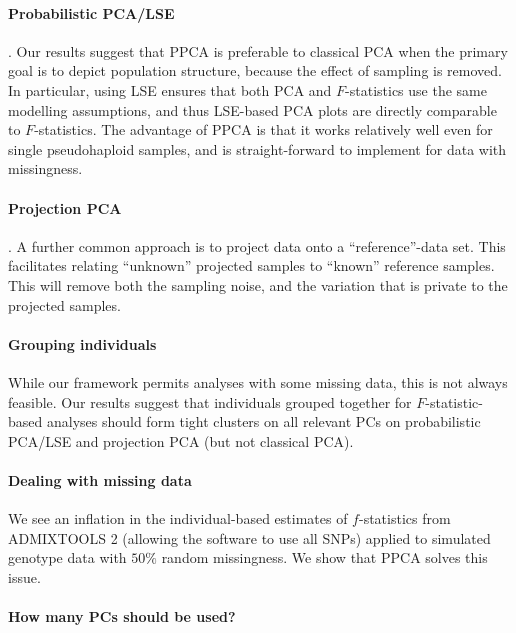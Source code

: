 \documentclass[12pt, letterpaper]{article}
\begin{document}
\paragraph{Probabilistic PCA/LSE}. Our results suggest that PPCA is preferable to classical PCA when the primary goal is to depict population structure, because the effect of sampling is removed. In particular, using LSE ensures that both PCA and $F$-statistics use the same modelling assumptions, and thus LSE-based PCA plots are directly comparable to $F$-statistics. The advantage of PPCA is that it works relatively well even for single pseudohaploid samples, and is straight-forward to implement for data with missingness.

\paragraph{Projection PCA}. A further common approach is to project data onto a ``reference''-data set. This facilitates relating ``unknown'' projected samples to ``known'' reference samples. This will remove both the sampling noise, and the variation that is private to the projected samples. 


\paragraph{Grouping individuals} While our framework permits analyses with some missing data, this is not always feasible. Our results suggest that individuals grouped together for $F$-statistic-based analyses should form tight clusters on all relevant PCs on probabilistic PCA/LSE and projection PCA (but not classical PCA). 


\paragraph{Dealing with missing data}
We see an inflation in the individual-based estimates of $f$-statistics from ADMIXTOOLS 2 (allowing the software to use all SNPs) applied to simulated genotype data with $50\%$ random missingness. We show that PPCA solves this issue.

\paragraph{How many PCs should be used?}
\end{document}
